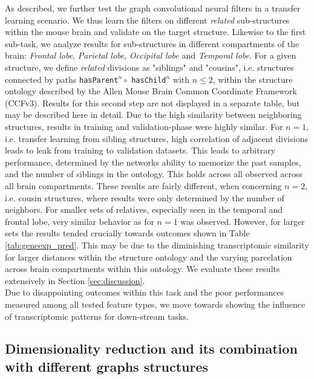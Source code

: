\documentclass[]{article}
\begin{document}
As described, we further test the graph convolutional neural filters in a transfer learning scenario. We thus learn the filters on different \textit{related} sub-structures within the mouse brain and validate on the target structure. Likewise to the first sub-task, we analyze results for sub-structures in different compartments of the brain: \textit{Frontal lobe}, \textit{Parietal lobe}, \textit{Occipital lobe } and \textit{Temporal lobe}.
For a given structure, we define \textit{related} divisions as "siblings" and "cousins", i.e. structures connected by paths \verb*|hasParent|$^n \circ$ \verb*|hasChild|$^n$ with $n\leq2$, within the structure ontology described by the Allen Mouse Brain Common Coordinate Framework (CCFv3). 
Results for this second step are not displayed in a separate table, but may be described here in detail. Due to the high similarity between neighboring structures, results in training and validation-phase were highly similar. For $n=1$, i.e. transfer learning from sibling structures, high correlation of adjacent divisions leads to leak from training to validation datasets. This leads to arbitrary performance, determined by the networks ability to memorize the past samples, and the number of siblings in the ontology. This holds across all observed across all brain compartments.
These results are fairly different, when concerning $n=2$, i.e. cousin structures, where results were only determined by the number of neighbors. For smaller sets of relatives, especially seen in the temporal and frontal lobe, very similar behavior as for $n=1$ was observed. However, for larger sets the results tended crucially towards outcomes shown in Table \ref{tab:geneexp_pred}. This may be due to the diminishing transcriptomic similarity for larger distances within the structure ontology and the varying parcelation across brain compartments within this ontology. 
We evaluate these results extensively in Section \ref{sec:discussion}. \\

Due to disappointing outcomes within this task and the poor performances measured among all tested feature types, we move towards showing the influence of transcriptomic patterns for down-stream tasks. 


\subsection{Dimensionality reduction and its combination with different graphs structures}
\label{sec:results_dimred}
\end{document}
